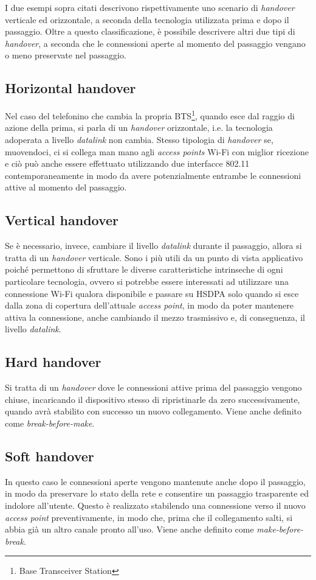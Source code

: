 I due esempi sopra citati descrivono rispettivamente uno scenario di {\em handover} verticale ed orizzontale, a seconda della tecnologia utilizzata prima e dopo il passaggio. Oltre a questo classificazione, è possibile descrivere altri due tipi di {\em handover}, a seconda che le connessioni aperte al momento del passaggio vengano o meno preservate nel passaggio.

\subsection{Horizontal handover}
Nel caso del telefonino che cambia la propria BTS\footnote{Base Transceiver Station}, quando esce dal raggio di azione della prima, si parla di un {\em handover} orizzontale, i.e. la tecnologia adoperata a livello {\em datalink} non cambia. Stesso tipologia di {\em handover} se, muovendoci, ci si collega man mano agli {\em access points} Wi-Fi con miglior ricezione e ciò può anche essere effettuato utilizzando due interfacce 802.11 contemporaneamente in modo da avere potenzialmente entrambe le connessioni attive al momento del passaggio.

\subsection{Vertical handover}
Se è necessario, invece, cambiare il livello {\em datalink} durante il passaggio, allora si tratta di un {\em handover} verticale. Sono i più utili da un punto di vista applicativo poiché permettono di sfruttare le diverse caratteristiche intrinseche di ogni particolare tecnologia, ovvero si potrebbe essere interessati ad utilizzare una connessione Wi-Fi qualora disponibile e passare su HSDPA solo quando si esce dalla zona di copertura dell'attuale {\em access point}, in modo da poter mantenere attiva la connessione, anche cambiando il mezzo trasmissivo e, di conseguenza, il livello {\em datalink}.

\subsection{Hard handover}
Si tratta di un {\em handover} dove le connessioni attive prima del passaggio vengono chiuse, incaricando il dispositivo stesso di ripristinarle da zero successivamente, quando avrà stabilito con successo un nuovo collegamento. Viene anche definito come {\em break-before-make}.

\subsection{Soft handover}
In questo caso le connessioni aperte vengono mantenute anche dopo il passaggio, in modo da preservare lo stato della rete e consentire un passaggio trasparente ed indolore all'utente. Questo è realizzato stabilendo una connessione verso il nuovo {\em access point} preventivamente, in modo che, prima che il collegamento salti, si abbia già un altro canale pronto all'uso. Viene anche definito come {\em make-before-break}.

